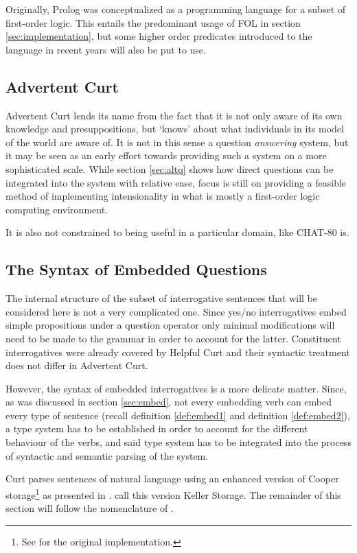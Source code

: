 \documentclass[a4paper]{article}
\newcommand{\abbr}{\textsf} %
\newcommand{\pn}{\textsf} %
\newcommand{\curt}{\pn{Curt}}
\newcommand{\acurt}{\pn{Advertent Curt}}
\newcommand{\prol}{\pn{Prolog}}
\theoremstyle{remark}
\theoremstyle{remark}
\theoremstyle{definition}
\theoremstyle{definition}
\begin{document}
Originally, \prol{} was conceptualized as a programming language for a subset of
first-order logic. This entails the predominant usage of \abbr{FOL} in section
\ref{sec:implementation}, but some higher order predicates introduced to the
language in recent years will also be put to use.

\subsection{Advertent Curt}

\acurt{} lends its name from the fact that it is not only aware of its own
knowledge and presuppositions, but `knows' about what individuals in its
model of the world are aware of. It is not in this sense a question
\emph{answering} system, but it may be seen as an early effort towards providing
such a system on a more sophisticated scale. While section \ref{sec:altq} shows
how direct questions can be integrated into the system with relative ease, focus
is still on providing a feasible method of implementing intensionality in what
is mostly a first-order logic computing environment.


It is also not constrained to being useful in a particular domain, like
\pn{CHAT-80} is.

\subsection{The Syntax of Embedded Questions}

The internal structure of the subset of interrogative sentences that will be
considered here is not a very complicated one. Since yes/no interrogatives  embed
simple propositions under a question operator only minimal modifications will
need to be made to the grammar in order to account for the latter. Constituent
interrogatives were already covered by \pn{Helpful Curt} and their syntactic
treatment does not differ in \acurt{}.

However, the syntax of embedded interrogatives is a more delicate matter. Since,
as was discussed in section \ref{sec:embed}, not every embedding verb can embed
every type of sentence (recall definition \ref{def:embed1} and definition
\ref{def:embed2}), a type system has to be established in order to account for
the different behaviour of the verbs, and said type system has to be integrated
into the process of syntactic and semantic parsing of the system.

\curt{} parses sentences of natural language using an enhanced version of \pn{Cooper
storage}\footnote{See \cite{cooper:storage2} for the original implementation.} as
presented in \cite{keller:storage}. \cite{blackburnbos:cl1} call this version
\pn{Keller Storage}. The remainder of this section will follow the nomenclature
of \cite{blackburnbos:cl1}. 
\end{document}
